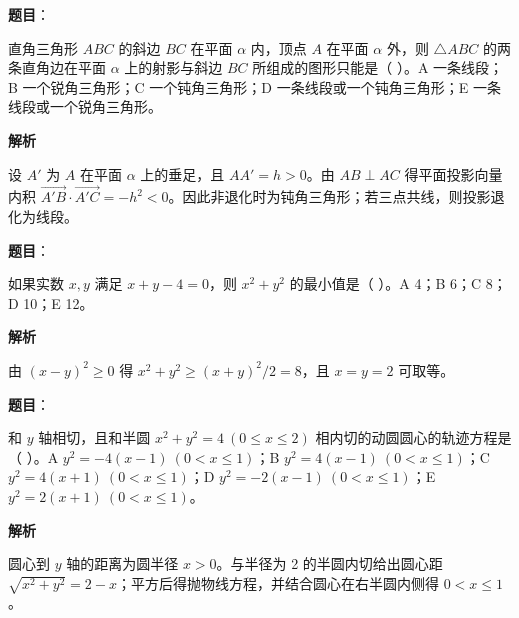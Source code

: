\begin{answer}

\textbf{题目}：

直角三角形 $ABC$ 的斜边 $BC$ 在平面 $\alpha$ 内，顶点 $A$ 在平面 $\alpha$ 外，则 $\triangle ABC$ 的两条直角边在平面 $\alpha$ 上的射影与斜边 $BC$ 所组成的图形只能是（ ）。A 一条线段；B 一个锐角三角形；C 一个钝角三角形；D 一条线段或一个钝角三角形；E 一条线段或一个锐角三角形。

\textbf{解析}

设 $A'$ 为 $A$ 在平面 $\alpha$ 上的垂足，且 $AA'=h>0$。由 $AB\perp AC$ 得平面投影向量内积 $\overrightarrow{A'B}\cdot\overrightarrow{A'C}=-h^2<0$。因此非退化时为钝角三角形；若三点共线，则投影退化为线段。


\end{answer}
\begin{answer}

\textbf{题目}：

如果实数 $x,y$ 满足 $x+y-4=0$，则 $x^2+y^2$ 的最小值是（ ）。A 4；B 6；C 8；D 10；E 12。

\textbf{解析}

由 $(x-y)^2\ge0$ 得 $x^2+y^2\ge(x+y)^2/2=8$，且 $x=y=2$ 可取等。


\end{answer}
\begin{answer}

\textbf{题目}：

和 $y$ 轴相切，且和半圆 $x^2+y^2=4\ (0\leq x\leq2)$ 相内切的动圆圆心的轨迹方程是（ ）。A $y^2=-4(x-1)\ (0<x\leq1)$；B $y^2=4(x-1)\ (0<x\leq1)$；C $y^2=4(x+1)\ (0<x\leq1)$；D $y^2=-2(x-1)\ (0<x\leq1)$；E $y^2=2(x+1)\ (0<x\leq1)$。

\textbf{解析}

圆心到 $y$ 轴的距离为圆半径 $x>0$。与半径为 2 的半圆内切给出圆心距 $\sqrt{x^2+y^2}=2-x$；平方后得抛物线方程，并结合圆心在右半圆内侧得 $0<x\le1$。


\end{answer}
